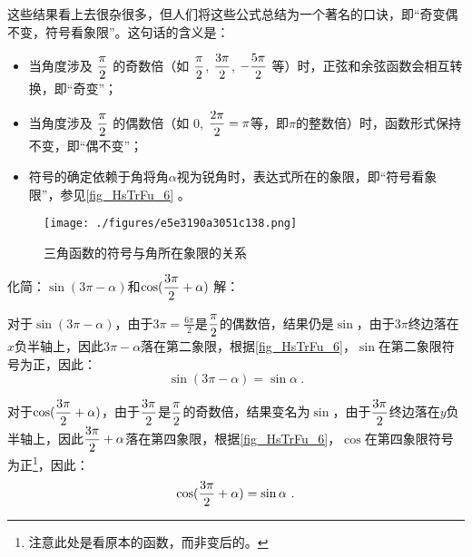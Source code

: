 这些结果看上去很杂很多，但人们将这些公式总结为一个著名的口诀，即“奇变偶不变，符号看象限”。这句话的含义是：
\begin{itemize}
\item 当角度涉及 $\displaystyle{\pi\over2}$ 的奇数倍（如 $\displaystyle{\pi\over2}$, $\displaystyle{3\pi\over2}$, $\displaystyle-{5\pi\over2}$ 等）时，正弦和余弦函数会相互转换，即“奇变”；
\item 当角度涉及 $\displaystyle{\pi\over2}$ 的偶数倍（如 $0$, $\displaystyle{2\pi\over2}=\pi$等，即$\pi$的整数倍）时，函数形式保持不变，即“偶不变”；
\item 符号的确定依赖于角将角$\alpha$视为锐角时，表达式所在的象限，即“符号看象限”，参见\autoref{fig_HsTrFu_6} 。
\end{itemize}

\begin{figure}[ht]
\centering
\texttt{[image: ./figures/e5e3190a3051c138.png]}
\caption{三角函数的符号与角所在象限的关系} \label{fig_HsTrFu_6}
\end{figure}

\begin{example}{化简：$\sin(3\pi-\alpha)$和$\displaystyle\cos({3\pi\over2}+\alpha)$}
解：

对于$\sin(3\pi-\alpha)$，由于$\displaystyle3\pi=\frac{6\pi}{2}$是$\displaystyle{\pi\over2}$的偶数倍，结果仍是$\sin$，由于$3\pi$终边落在$x$负半轴上，因此$3\pi-\alpha$落在第二象限，根据\autoref{fig_HsTrFu_6}，$\sin$在第二象限符号为正，因此：
$$
\sin(3\pi-\alpha)=\sin\alpha~.
$$

对于$\displaystyle\cos({3\pi\over2}+\alpha)$，由于$\displaystyle{3\pi\over2}$是$\displaystyle{\pi\over2}$的奇数倍，结果变名为$\sin$，由于$\displaystyle{3\pi\over2}$终边落在$y$负半轴上，因此$\displaystyle{3\pi\over2}+\alpha$落在第四象限，根据\autoref{fig_HsTrFu_6}，$\cos$在第四象限符号为正\footnote{注意此处是看原本的函数，而非变后的。}，因此：
$$
\cos({3\pi\over2}+\alpha)=\sin\alpha~.
$$
\end{example}
